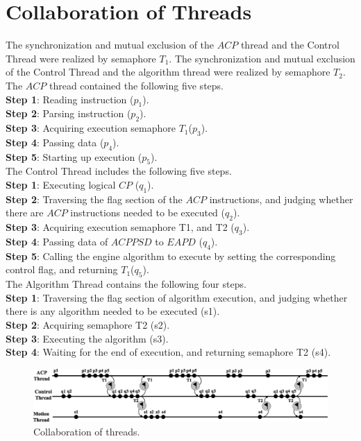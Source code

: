 \documentclass[journal]{IEEEtran}
\begin{document}
\section{Collaboration of Threads}
\label{Collaboration-Threads}
The synchronization and mutual exclusion of the $ACP$ thread and the Control Thread were realized by semaphore $T_1$. The synchronization and mutual exclusion of the Control Thread and the algorithm thread were realized by semaphore $T_2$. The $ACP$ thread contained the following five steps.\\
\textbf{Step 1}: Reading instruction ($p_1$).\\
\textbf{Step 2}: Parsing instruction ($p_2$).\\
\textbf{Step 3}: Acquiring execution semaphore $T_1$($p_3$).\\
\textbf{Step 4}: Passing data ($p_4$).\\
\textbf{Step 5}: Starting up execution ($p_5$).\\
The Control Thread includes the following five steps.\\
\textbf{Step 1}: Executing logical $CP$ ($q_1$).\\
\textbf{Step 2}: Traversing the flag section of the $ACP$ instructions, and judging whether there are $ACP$ instructions needed to be executed ($q_2$).\\
\textbf{Step 3}: Acquiring execution semaphore T1, and T2 ($q_3$).\\
\textbf{Step 4}: Passing data of $ACPPSD$ to $EAPD$ ($q_4$).\\
\textbf{Step 5}: Calling the engine algorithm to execute by setting the corresponding control flag, and returning $T_1$($q_5$).\\
The Algorithm Thread contains the following four steps.\\
\textbf{Step 1}: Traversing the flag section of algorithm execution, and judging whether there is any algorithm needed to be executed (s1).\\
\textbf{Step 2}: Acquiring semaphore T2 (s2).\\
\textbf{Step 3}: Executing the algorithm (s3).\\
\textbf{Step 4}: Waiting for the end of execution, and returning semaphore T2 (s4).\\

\begin{figure}
\raggedright
\includegraphics[width=7in,keepaspectratio]{fig/FIG12_TII-18-0024.eps}
\caption{Collaboration of threads.}
\label{fig:The corporation of threads}
\end{figure}
 
\end{document}
